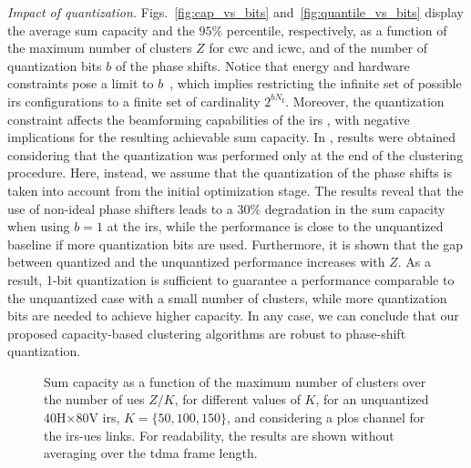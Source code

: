 \emph{Impact of quantization.} Figs.~\ref{fig:cap_vs_bits} and~\ref{fig:quantile_vs_bits} display the average sum capacity and the $95\%$ percentile, respectively, as a function of the maximum number of clusters $Z$ for \gls{cwc} and \gls{icwc}, and of the number of quantization bits $b$ of the phase shifts. 
Notice that energy and hardware constraints pose a limit to $b$~\cite{rivera2022optimization}, which implies restricting the infinite set of possible \gls{irs} configurations to a finite set of cardinality $2^{bN_{\mathrm I}}$. 
Moreover, the quantization constraint affects the beamforming capabilities of the \gls{irs} \cite{abeywickrama2020intelligent}, with negative implications for the resulting achievable sum capacity.
In \cite{rech2023downlink}, results were obtained considering that the quantization was performed only at the end of the clustering procedure. Here, instead, we assume that the quantization of the phase shifts is taken into account from the initial optimization stage.
The results reveal that the use of non-ideal phase shifters leads to a $30\%$ degradation in the sum capacity when using $b=1$ at the \gls{irs}, while the performance is close to the unquantized baseline if more quantization bits are used.
Furthermore, it is shown that the gap between quantized and the unquantized performance increases with $Z$. As a result, 1-bit quantization is sufficient to guarantee a performance comparable to the unquantized case with a small number of clusters, while more quantization bits are needed to achieve higher capacity.
In any case, we can conclude that our proposed capacity-based clustering algorithms are robust to phase-shift quantization. 

\begin{figure}[t]
    \centering
    \setlength{}
    \setlength{}
    
    \caption{Sum capacity as a function of the maximum number of clusters over the number of \glspl{ue} $Z/K$, for different values of $K$, for an unquantized $40$H$\times80$V \gls{irs}, $K = \{50, 100, 150\}$, and considering a \gls{plos} channel for the \gls{irs}-\glspl{ue} links. For readability, the results are shown without averaging over the \gls{tdma} frame length.}
    \label{fig:sumcap_vs_ZK}
\end{figure}


